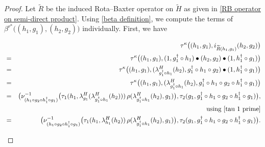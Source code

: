 \documentclass{jonasart}
\theoremstyle{plain}
\begin{document}
\begin{proof}
		Let $\widetilde{R}$ be the induced Rota--Baxter operator on $\widetilde{H}$ as given in \eqref{RB operator on semi-direct product}. Using \eqref{beta definition}, we compute the terms of $\beta^{r^\kappa} \big((h_1,g_1),(h_2,g_2)\big)$ individually. First, we have
		\begin{small}
			\begin{eqnarray}
				&& 	\tau^{\kappa}\big((h_1,g_1),i_{\widetilde{R}(h_1,g_1)}(h_2,g_2)\big) \nonumber\\
				&=&\tau^{\kappa}\big((h_1,g_1),(1,g_1^\dagger\circ h_1) \bullet (h_2,g_2) \bullet (1,h_1^\dagger\circ g_1)\big)\nonumber\\
				&=&\tau^{\kappa}\big((h_1,g_1),(\lambda^H_{g_1^\dagger\circ h_1}(h_2),g_1^\dagger\circ h_1\circ g_2) \bullet (1,h_1^\dagger\circ g_1)\big)\nonumber\\
				&=&\tau^{\kappa}\big((h_1,g_1),(\lambda^H_{g_1^\dagger\circ h_1}(h_2),g_1^\dagger\circ h_1\circ g_2\circ h_1^\dagger\circ g_1)\big)\nonumber\\
				& =&\big(\nu^{-1}_{(h_1\circ g_2\circ h_1^\dagger\circ g_1)}\big(\tau_1(h_1,\lambda^H_{g_1}(\lambda^H_{g_1^\dagger\circ h_1}(h_2))) \,\rho(\lambda^H_{g_1^\dagger\circ h_1}(h_2),g_1)\big), \tau_2(g_1,g_1^\dagger\circ h_1\circ g_2\circ h_1^\dagger\circ g_1)\big), \nonumber\\
				&&\text{using  \eqref{tau 1 prime}}\nonumber\\
				& =&\big(\nu^{-1}_{(h_1\circ g_2\circ h_1^\dagger\circ g_1)}\big(\tau_1(h_1,\lambda^H_{ h_1}(h_2))\, \rho(\lambda^H_{g_1^\dagger\circ h_1}(h_2),g_1)\big), \tau_2(g_1,g_1^\dagger\circ h_1\circ g_2\circ h_1^\dagger\circ g_1)\big).\label{beta term 1}
			\end{eqnarray}
		\end{small}
		

\end{proof}
\end{document}
